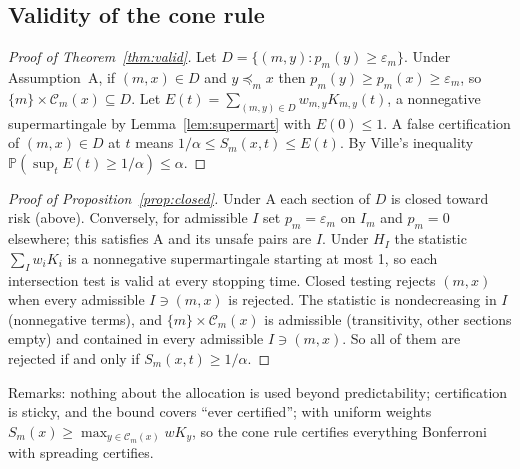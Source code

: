 \documentclass{article}
\newcommand{\eps}{\varepsilon}
\newcommand{\preceqm}{\preceq_m}
\newcommand{\Cone}{\mathcal{C}}
\renewcommand{\P}{\mathbb{P}}
\begin{document}
\subsection{Validity of the cone rule}\label{app:valid}
\begin{proof}[Proof of Theorem~\ref{thm:valid}]
Let $D=\{(m,y):p_m(y)\ge\eps_m\}$. Under Assumption~A, if $(m,x)\in D$ and
$y\preceqm x$ then $p_m(y)\ge p_m(x)\ge\eps_m$, so $\{m\}\times\Cone_m(x)
\subseteq D$. Let $E(t)=\sum_{(m,y)\in D}w_{m,y}K_{m,y}(t)$, a nonnegative
supermartingale by Lemma~\ref{lem:supermart} with $E(0)\le1$. A false
certification of $(m,x)\in D$ at $t$ means $1/\alpha\le S_m(x,t)\le E(t)$.
By Ville's inequality $\P(\sup_tE(t)\ge1/\alpha)\le\alpha$.
\end{proof}
\begin{proof}[Proof of Proposition~\ref{prop:closed}]
Under A each section of $D$ is closed toward risk (above). Conversely, for
admissible $I$ set $p_m=\eps_m$ on $I_m$ and $p_m=0$ elsewhere; this
satisfies A and its unsafe pairs are $I$. Under $H_I$ the statistic
$\sum_Iw_iK_i$ is a nonnegative supermartingale starting at most 1, so
each intersection test is valid at every stopping time. Closed testing
rejects $(m,x)$ when every admissible $I\ni(m,x)$ is rejected. The
statistic is nondecreasing in $I$ (nonnegative terms), and
$\{m\}\times\Cone_m(x)$ is admissible (transitivity, other sections empty)
and contained in every admissible $I\ni(m,x)$. So all of them are rejected
if and only if $S_m(x,t)\ge1/\alpha$.
\end{proof}
Remarks: nothing about the allocation is used beyond predictability;
certification is sticky, and the bound covers ``ever certified''; with
uniform weights $S_m(x)\ge\max_{y\in\Cone_m(x)}wK_y$, so the cone rule
certifies everything Bonferroni with spreading certifies.
\end{document}
